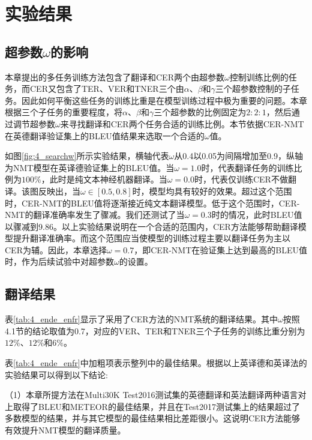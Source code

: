 \section{实验结果}

\subsection{超参数$\omega$的影响}
\label{sec:4_omega}
本章提出的多任务训练方法包含了翻译和CER两个由超参数$\omega$控制训练比例的任务，而CER又包含了TER、VER和TNER三个由$\alpha$、$\beta$和$\gamma$三个超参数控制的子任务。因此如何平衡这些任务的训练比重是在模型训练过程中极为重要的问题。本章根据三个子任务的重要程度，将$\alpha$、$\beta$和$\gamma$三个超参数的比例固定为$2:2:1$，然后通过调节超参数$\omega$来寻找翻译和CER两个任务合适的训练比例。本节依据CER-NMT在英德翻译验证集上的BLEU值结果来选取一个合适的$\omega$值。


如图\ref{fig:4_searchw}所示实验结果，横轴代表$\omega$从0.4以0.05为间隔增加至0.9，纵轴为NMT模型在英译德验证集上的BLEU值。当$\omega=1.0$时，代表翻译任务的训练比例为$100\%$，此时是纯文本神经机器翻译。当$\omega=0.0$时，代表仅训练CER不做翻译。该图反映出，当$\omega \in [0.5,0.8]$时，模型均具有较好的效果。超过这个范围时，CER-NMT的BLEU值将逐渐接近纯文本翻译模型。低于这个范围时，CER-NMT的翻译准确率发生了骤减。我们还测试了当$\omega=0.3$时的情况，此时BLEU值以骤减到9.86。以上实验结果说明在一个合适的范围内，CER方法能够帮助翻译模型提升翻译准确率。而这个范围应当使模型的训练过程主要以翻译任务为主以CER为辅。因此，本章选择$\omega=0.7$，即CER-NMT在验证集上达到最高的BLEU值时，作为后续试验中对超参数$\omega$的设置。


\subsection{翻译结果}
\label{sec:4_ende}



表\ref{tab:4_ende_enfr}显示了采用了CER方法的NMT系统的翻译结果。其中$\omega$按照4.1节的结论取值为0.7，对应的VER、TER和TNER三个子任务的训练比重分别为$12\%$、$12\%$和$6\%$。


表\ref{tab:4_ende_enfr}中加粗项表示整列中的最佳结果。根据以上英译德和英译法的实验结果可以得到以下结论:

（1）本章所提方法在Multi30K Test2016测试集的英德翻译和英法翻译两种语言对上取得了BLEU和METEOR的最佳结果，并且在Test2017测试集上的结果超过了多数模型的结果，并与其它模型的最佳结果相比差距很小。这说明CER方法能够有效提升NMT模型的翻译质量。

